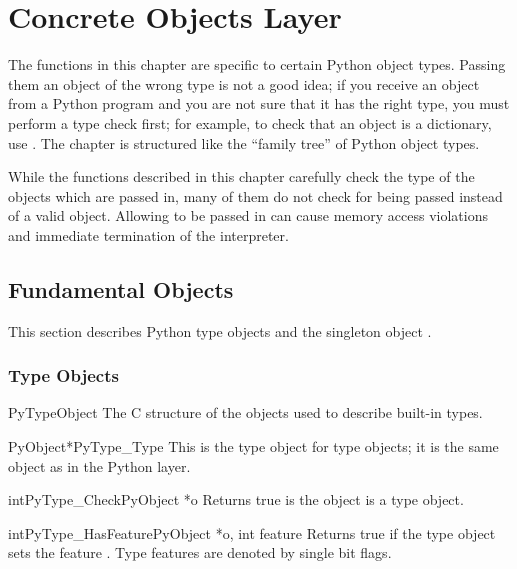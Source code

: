 \documentclass{manual}
\begin{document}
\chapter{Concrete Objects Layer \label{concrete}}

The functions in this chapter are specific to certain Python object
types.  Passing them an object of the wrong type is not a good idea;
if you receive an object from a Python program and you are not sure
that it has the right type, you must perform a type check first;
for example, to check that an object is a dictionary, use
.  The chapter is structured like the
``family tree'' of Python object types.

While the functions described in this chapter carefully check the type
of the objects which are passed in, many of them do not check for
\NULL{} being passed instead of a valid object.  Allowing \NULL{} to
be passed in can cause memory access violations and immediate
termination of the interpreter.


\section{Fundamental Objects \label{fundamental}}

This section describes Python type objects and the singleton object 
.


\subsection{Type Objects \label{typeObjects}}

\begin{ctypedesc}{PyTypeObject}
The C structure of the objects used to describe built-in types.
\end{ctypedesc}

\begin{cvardesc}{PyObject*}{PyType_Type}
This is the type object for type objects; it is the same object as
 in the Python layer.
\end{cvardesc}

\begin{cfuncdesc}{int}{PyType_Check}{PyObject *o}
Returns true is the object  is a type object.
\end{cfuncdesc}

\begin{cfuncdesc}{int}{PyType_HasFeature}{PyObject *o, int feature}
Returns true if the type object  sets the feature
.  Type features are denoted by single bit flags.
\end{cfuncdesc}
\end{document}
